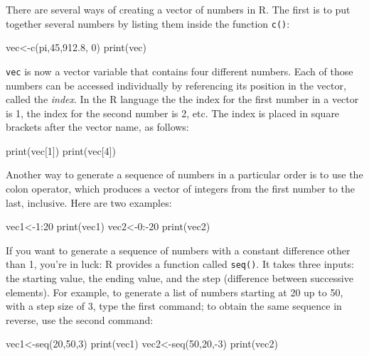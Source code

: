\documentclass[
  letterpaper,
  DIV=11,
  numbers=noendperiod]{scrreprt}
\newenvironment{Shaded}{\begin{snugshade}}{\end{snugshade}}
\newcommand{\NormalTok}[1]{\textcolor[rgb]{0.00,0.23,0.31}{#1}}
\begin{document}
There are several ways of creating a vector of numbers in R. The first
is to put together several numbers by listing them inside the function
\texttt{c()}:

\begin{Shaded}
\begin{Highlighting}[]
\NormalTok{vec\textless{}{-}c(pi,45,912.8, 0)}
\NormalTok{print(vec)}
\end{Highlighting}
\end{Shaded}

\texttt{vec} is now a vector variable that contains four different
numbers. Each of those numbers can be accessed individually by
referencing its position in the vector, called the \emph{index}. In the
R language the the index for the first number in a vector is 1, the
index for the second number is 2, etc. The index is placed in square
brackets after the vector name, as follows:

\begin{Shaded}
\begin{Highlighting}[]
\NormalTok{print(vec[1])}
\NormalTok{print(vec[4])}
\end{Highlighting}
\end{Shaded}

Another way to generate a sequence of numbers in a particular order is
to use the colon operator, which produces a vector of integers from the
first number to the last, inclusive. Here are two examples:

\begin{Shaded}
\begin{Highlighting}[]
\NormalTok{vec1\textless{}{-}1:20}
\NormalTok{print(vec1)}
\NormalTok{vec2\textless{}{-}0:{-}20}
\NormalTok{print(vec2)}
\end{Highlighting}
\end{Shaded}

If you want to generate a sequence of numbers with a constant difference
other than 1, you're in luck: R provides a function called
\texttt{seq()}. It takes three inputs: the starting value, the ending
value, and the step (difference between successive elements). For
example, to generate a list of numbers starting at 20 up to 50, with a
step size of 3, type the first command; to obtain the same sequence in
reverse, use the second command:

\begin{Shaded}
\begin{Highlighting}[]
\NormalTok{vec1\textless{}{-}seq(20,50,3)}
\NormalTok{print(vec1)}
\NormalTok{vec2\textless{}{-}seq(50,20,{-}3)}
\NormalTok{print(vec2)}
\end{Highlighting}
\end{Shaded}
\end{document}
